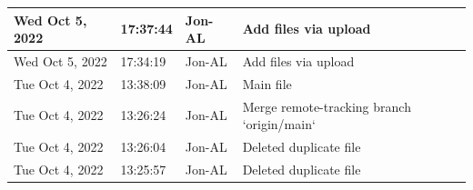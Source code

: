 \documentclass[11pt]{article}
\begin{document}
\begin{center}
\begin{longtable}{|p{2.7cm}|l|p{2cm}|p{8cm}|}
           \hline Wed Oct 5, 2022                            & 17:37:44                           & Jon-AL                                  & Add files via upload                                                                                                                                                                                                                                                                                       \\
           \hline Wed Oct 5, 2022                            & 17:34:19                           & Jon-AL                                  & Add files via upload                                                                                                                                                                                                                                                                                       \\
           \hline Tue Oct 4, 2022                            & 13:38:09                           & Jon-AL                                  & Main file                                                                                                                                                                                                                                                                                                  \\
           \hline Tue Oct 4, 2022                            & 13:26:24                           & Jon-AL                                  & Merge remote-tracking branch `origin/main`                                                                                                                                                                                                                                                                 \\
           \hline Tue Oct 4, 2022                            & 13:26:04                           & Jon-AL                                  & Deleted duplicate file                                                                                                                                                                                                                                                                                     \\
           \hline Tue Oct 4, 2022                            & 13:25:57                           & Jon-AL                                  & Deleted duplicate file                                                                                                                                                                                                                                                                                     \\

\end{longtable}
\end{center}
\end{document}
